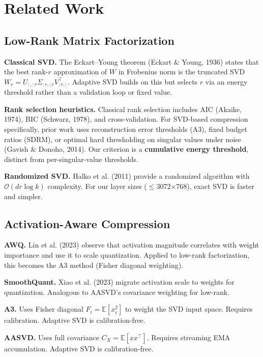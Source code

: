 
\section{Related Work}

\subsection{Low-Rank Matrix Factorization}

\textbf{Classical SVD.} The Eckart--Young theorem (Eckart \& Young, 1936) states 
that the best rank-$r$ approximation of $W$ in Frobenius norm is the truncated 
SVD $W_r = U_{:, :r} \Sigma_{:r, :r} V_{:r, :}^\top$. Adaptive SVD builds 
on this but selects $r$ via an energy threshold rather than a validation 
loop or fixed value.

\textbf{Rank selection heuristics.} Classical rank selection includes AIC 
(Akaike, 1974), BIC (Schwarz, 1978), and cross-validation. For SVD-based 
compression specifically, prior work uses reconstruction error thresholds 
(A3), fixed budget ratios (SDRM), or optimal hard thresholding on 
singular values under noise (Gavish \& Donoho, 2014). Our criterion is a 
\textbf{cumulative energy threshold}, distinct from per-singular-value thresholds.

\textbf{Randomized SVD.} Halko et al. (2011) provide a randomized algorithm with 
$\mathcal{O}(d r \log k)$ complexity. For our layer sizes ($\le$3072$\times$768), exact 
SVD is faster and simpler.

\subsection{Activation-Aware Compression}

\textbf{AWQ.} Lin et al. (2023) observe that activation magnitude correlates with 
weight importance and use it to scale quantization. Applied to low-rank 
factorization, this becomes the A3 method (Fisher diagonal weighting).

\textbf{SmoothQuant.} Xiao et al. (2023) migrate activation scale to weights for 
quantization. Analogous to AASVD's covariance weighting for low-rank.

\textbf{A3.} Uses Fisher diagonal $F_i = \mathbb{E}[x_i^2]$ to weight the SVD input 
space. Requires calibration. Adaptive SVD is calibration-free.

\textbf{AASVD.} Uses full covariance $C_X = \mathbb{E}[x x^\top]$. Requires 
streaming EMA accumulation. Adaptive SVD is calibration-free.

